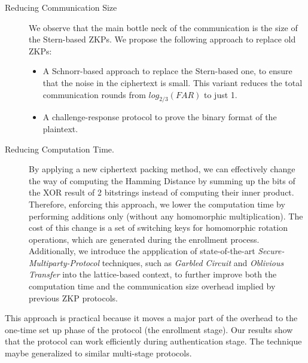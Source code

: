 \begin{description}
\item[Reducing Communication Size] We observe that the main bottle neck of the
  communication is the size of the Stern-based ZKPs. We propose the
  following approach to replace old ZKPs:
  \begin{itemize}
  \item A Schnorr-based approach to replace the Stern-based one, to ensure that the
    noise in the ciphertext is small. This variant reduces the total
    communication rounds from \(log_{2/3}(FAR)\) to just 1.
  \item A challenge-response protocol to prove the binary format of the
    plaintext.
  \end{itemize}
\item[Reducing Computation Time.] By applying a new ciphertext packing
  method, we can effectively change the way of computing the Hamming Distance by
  summing up the bits of the XOR result of 2 bitstrings instead of computing their
  inner product. Therefore, enforcing this approach, we lower the computation time by performing
  additions only (without any homomorphic multiplication). The cost of this change
  is a set of switching keys for homomorphic rotation operations, which are
  generated during the enrollment process. Additionally, we introduce the
  appplication of state-of-the-art \textit{Secure-Multiparty-Protocol}
  techniques, such as \textit{Garbled Circuit} and \textit{Oblivious Transfer} into
  the lattice-based context, to further improve both the computation time and
  the communication size overhead implied by previous ZKP protocols.
\end{description}
This approach is practical because it moves a major part of the overhead to the
one-time set up phase of the protocol (the enrollment stage). Our results show
that the protocol can work efficiently during authentication stage. The
technique maybe generalized to similar multi-stage protocols.


